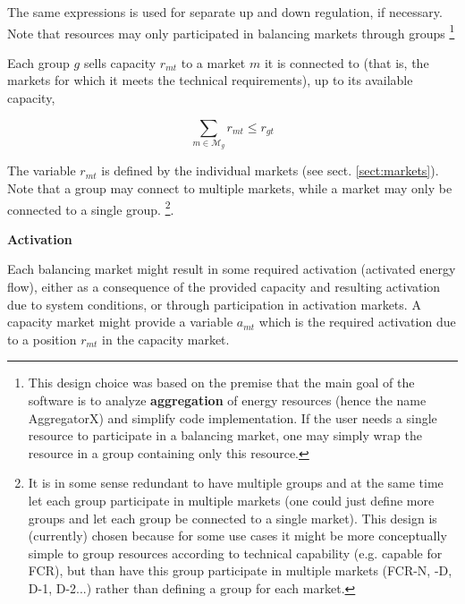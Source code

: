 \documentclass[]{report}
\renewcommand{\emph}{\textbf}
\newcommand{\marketsg}{\mathcal{M}_g}
\begin{document}
The same expressions is used for separate up and down regulation, if necessary. Note that resources may only participated in balancing markets through groups
\footnote{This design choice was based on the premise that the main goal of the software is to analyze \emph{aggregation} of  energy resources (hence the name AggregatorX) and simplify code implementation. If the user needs a single resource to participate in a balancing market, one may simply wrap the resource in a group containing only this resource.}

Each group $g$ sells capacity $r_{mt}$ to a market $m$ it is connected to (that is, the markets for which it meets the technical requirements), up to its available capacity,

\begin{equation}
\label{const:rm_lt_rg}
\sum_{m \in \marketsg} r_{mt} \leq r_{gt}
\end{equation}

The variable $r_{mt}$ is defined by the individual markets (see sect. \ref{sect:markets}). Note that a group may connect to multiple markets, while a market may only be connected to a single group. 
\footnote{It is in some sense redundant to have multiple groups and at the same time let each group participate in multiple markets (one could just define more groups and let each group be connected to a single market). This design is (currently) chosen because for some use cases it might be more conceptually simple to group resources according to technical capability (e.g. capable for FCR), but than have this group participate in multiple markets (FCR-N, -D, D-1, D-2...) rather than defining a group for each market.}.


 
\textbf{Activation}

Each balancing market might result in some required activation (activated energy flow), either as a consequence of the provided capacity and resulting activation due to system conditions, or through participation in activation markets. A capacity market might provide a variable $a_{mt}$ which is the required activation due to a position $r_{mt}$ in the capacity market. 


\end{document}
